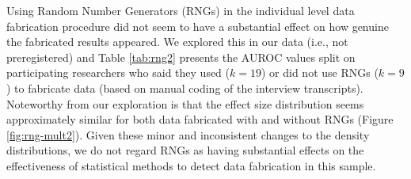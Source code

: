 \documentclass[a5paper]{book}
\begin{document}
Using Random Number Generators (RNGs) in the individual level data
fabrication procedure did not seem to have a substantial effect on how
genuine the fabricated results appeared. We explored this in our data
(i.e., not preregistered) and Table \ref{tab:rng2} presents the AUROC
values split on participating researchers who said they used (\(k=19\))
or did not use RNGs (\(k=9\)) to fabricate data (based on manual coding
of the interview transcripts). Noteworthy from our exploration is that
the effect size distribution seems approximately similar for both data
fabricated with and without RNGs (Figure \ref{fig:rng-mult2}). Given
these minor and inconsistent changes to the density distributions, we do
not regard RNGs as having substantial effects on the effectiveness of
statistical methods to detect data fabrication in this sample.
\end{document}
